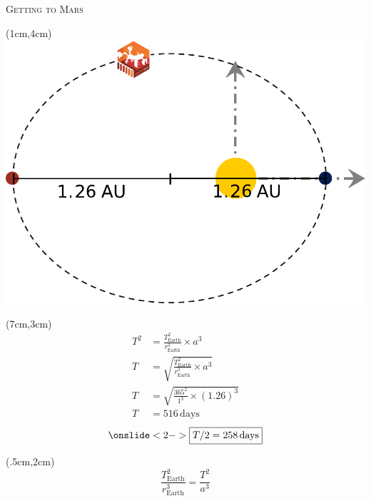 \documentclass[9pt]{beamer}
\begin{document}
    \begin{frame}{\textsc{Getting to Mars}}
        \begin{textblock*}{5cm}(1cm,4cm)
            \centering
            \includegraphics[scale=0.35]{assets/orbit_pers.pdf}
        \end{textblock*}
        
        \begin{textblock*}{4cm}(7cm,3cm)
            \centering
            \begin{align*}
                T^2 &= \frac{T^2_{\text{Earth}}}{r^3_{\text{Earth}}}\times a^3\\
                T &= \sqrt{\frac{T^2_{\text{Earth}}}{r^3_{\text{Earth}}}\times a^3}\\
                T &= \sqrt{\frac{365^2}{1^3}\times (1.26)^3}\\
                T &= 516\,\text{days}
            \end{align*}
            \begin{align*}
                \onslide<2->{\boxed{T / 2 = 258\,\text{days}}}
            \end{align*}

        \end{textblock*}
        
        \begin{textblock*}{12cm}(.5cm,2cm)
        \begin{equation*}
            {\frac{T_{\text{Earth}}^2}{r_{\text{Earth}}^3} = \frac{T^2}{a^3}}
        \end{equation*}
        \end{textblock*}
    \end{frame}
\end{document}
